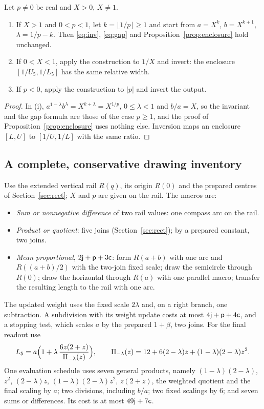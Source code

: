 \begin{proposition}\label{prop:allp}
Let $p\neq0$ be real and $X>0$, $X\neq1$.
\begin{enumerate}[label=(\roman*)]
\item If $X>1$ and $0<p<1$, let $k=\lfloor1/p\rfloor\ge1$ and start from $a=X^{k}$, $b=X^{k+1}$,
  $\lambda=1/p-k$. Then \eqref{eq:inv}, \eqref{eq:gap} and Proposition~\ref{prop:enclosure} hold
  unchanged.
\item If $0<X<1$, apply the construction to $1/X$ and invert: the enclosure $[1/U_5,1/L_5]$ has the same
  relative width.
\item If $p<0$, apply the construction to $|p|$ and invert the output.
\end{enumerate}
\end{proposition}
\begin{proof}
In (i), $a^{1-\lambda}b^{\lambda}=X^{k+\lambda}=X^{1/p}$, $0\le\lambda<1$ and $b/a=X$, so the invariant
and the gap formula are those of the case $p\ge1$, and the proof of Proposition~\ref{prop:enclosure}
uses nothing else. Inversion maps an enclosure $[L,U]$ to $[1/U,1/L]$ with the same ratio.
\end{proof}

\subsection{A complete, conservative drawing inventory}\label{sec:macros}

Use the extended vertical rail $R(q)$, its origin $R(0)$ and the prepared centres of
Section~\ref{sec:rect}; $X$ and $p$ are given on the rail. The macros are:
\begin{itemize}
\item \emph{Sum or nonnegative difference} of two rail values: one compass arc on the rail.
\item \emph{Product or quotient}: five joins (Section~\ref{sec:rect}); by a prepared constant, two joins.
\item \emph{Mean proportional}, $2\mathsf{j}+\mathsf{p}+3\mathsf{c}$: form $R(a+b)$ with one arc and $R((a+b)/2)$ with the
  two-join fixed scale; draw the semicircle through $R(0)$; draw the horizontal through $R(a)$ with one
  parallel macro; transfer the resulting length to the rail with one arc.
\end{itemize}
The updated weight uses the fixed scale $2\lambda$ and, on a right branch, one subtraction. A
subdivision with its weight update costs at most $4\mathsf{j}+\mathsf{p}+4\mathsf{c}$, and a stopping test, which scales $a$
by the prepared $1+\beta$, two joins. For the final readout use
\begin{equation}\label{eq:L5eval}
L_5=a\Bigl(1+\lambda\,\frac{6z(2+z)}{\Pi_{-\lambda}(z)}\Bigr),\qquad
\Pi_{-\lambda}(z)=12+6(2-\lambda)z+(1-\lambda)(2-\lambda)z^{2}.
\end{equation}
One evaluation schedule uses seven general products, namely $(1-\lambda)(2-\lambda)$, $z^{2}$,
$(2-\lambda)z$, $(1-\lambda)(2-\lambda)z^{2}$, $z(2+z)$, the weighted quotient and the final scaling by
$a$; two divisions, including $b/a$; two fixed scalings by $6$; and seven sums or differences. Its cost
is at most $49\mathsf{j}+7\mathsf{c}$.


